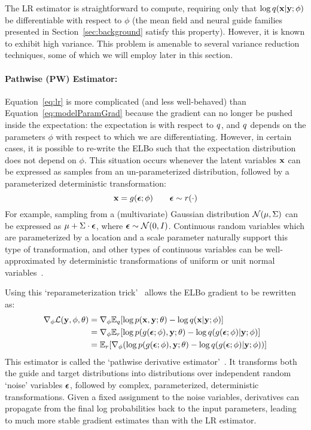The LR estimator is straightforward to compute, requiring only that $\log q(\mathbf{x} | \mathbf{y} ; \phi)$ be differentiable with respect to $\phi$ (the mean field and neural guide families presented in Section~\ref{sec:background} satisfy this property). However, it is known to exhibit high variance. This problem is amenable to several variance reduction techniques, some of which we will employ later in this section.

\paragraph{Pathwise (PW) Estimator:}

Equation~\ref{eq:lr} is more complicated (and less well-behaved) than Equation~\ref{eq:modelParamGrad} because the gradient can no longer be pushed inside the expectation: the expectation is with respect to $q$, and $q$ depends on the parameters $\phi$ with respect to which we are differentiating.
However, in certain cases, it is possible to re-write the ELBo such that the expectation distribution does not depend on $\phi$.
This situation occurs whenever the latent variables $\mathbf{x}$ can be expressed as samples from an un-parameterized distribution, followed by a parameterized deterministic transformation:
\begin{equation*}
\mathbf{x} = g(\bm{\epsilon} ; \phi) \hspace{2em} \bm{\epsilon} \sim r(\cdot)
\end{equation*}
For example, sampling from a (multivariate) Gaussian distribution $\mathcal{N}(\mu, \Sigma)$ can be expressed as $\mu + \Sigma \cdot \bm{\epsilon}$, where $\bm{\epsilon} \sim \mathcal{N}(0, I)$. Continuous random variables which are parameterized by a location and a scale parameter naturally support this type of transformation, and other types of continuous variables can be well-approximated by deterministic transformations of uniform or unit normal variables~\cite{ADVI}.

Using this `reparameterization trick'~\cite{AEVB} allows the ELBo gradient to be rewritten as:
\begin{align}
\begin{split}
\nabla_\phi \mathcal{L}(\mathbf{y}, \phi, \theta)
&= \nabla_\phi \mathbb{E}_{q}[ \log p(\mathbf{x}, \mathbf{y}; \theta) - \log q(\mathbf{x} | \mathbf{y} ; \phi) ]\\
&= \nabla_\phi \mathbb{E}_{r} [ \log p(g(\bm{\epsilon} ; \phi), \mathbf{y} ; \theta) - \log q(g(\bm{\epsilon} ; \phi) | \mathbf{y} ; \phi) ]\\
&= \mathbb{E}_{r} [\nabla_\phi ( \log p(g(\bm{\epsilon} ; \phi), \mathbf{y} ; \theta) - \log q(g(\bm{\epsilon} ; \phi) | \mathbf{y} ; \phi) ) ]
\end{split}
\label{eq:pw}
\end{align}
This estimator is called the `pathwise derivative estimator'~\cite{PathwiseEstimator}.
It transforms both the guide and target distributions into distributions over independent random `noise' variables $\bm{\epsilon}$, followed by complex, parameterized, deterministic transformations. Given a fixed assignment to the noise variables, derivatives can propagate from the final log probabilities back to the input parameters, leading to much more stable gradient estimates than with the LR estimator.

